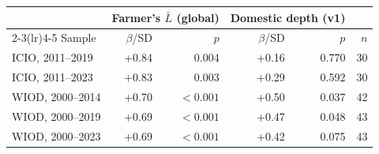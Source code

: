 \begin{tabular}{lrrrrr}
\toprule
 & \multicolumn{2}{c}{Farmer's $\bar L$ (global)} & \multicolumn{2}{c}{Domestic depth (v1)} & \\
\cmidrule(lr){2-3}\cmidrule(lr){4-5}
Sample & $\beta$/SD & $p$ & $\beta$/SD & $p$ & $n$ \\
\midrule
ICIO, 2011--2019 & +0.84 & 0.004 & +0.16 & 0.770 & 30 \\
ICIO, 2011--2023 & +0.83 & 0.003 & +0.29 & 0.592 & 30 \\
WIOD, 2000--2014 & +0.70 & $<0.001$ & +0.50 & 0.037 & 42 \\
WIOD, 2000--2019 & +0.69 & $<0.001$ & +0.47 & 0.048 & 43 \\
WIOD, 2000--2023 & +0.69 & $<0.001$ & +0.42 & 0.075 & 43 \\
\bottomrule
\end{tabular}
